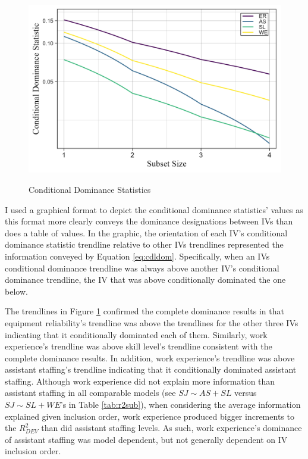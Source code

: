 \documentclass[man]{apa7}
\begin{document}
	\begin{figure}[h!]
		\centering
		\caption{\centering Conditional Dominance Statistics}
		\includegraphics{condit_gph}
		\label{fg:cdl}
	\end{figure}

	I used a graphical format to depict the conditional dominance statistics' values as this format more clearly conveys the dominance designations between IVs than does a table of values. 
	In the graphic, the orientation of each IV's conditional dominance statistic trendline relative to other IVs trendlines represented the information conveyed by Equation \ref{eq:cdldom}.
	Specifically, when an IVs conditional dominance trendline was always above another IV's conditional dominance trendline, the IV that was above conditionally dominated the one below.
	
	The trendlines in Figure \ref{fg:cdl} confirmed the complete dominance results in that equipment reliability's trendline was above the trendlines for the other three IVs indicating that it conditionally dominated each of them.
	Similarly, work experience's trendline was above skill level's trendline consistent with the complete dominance results.
	In addition, work experience's trendline was above assistant staffing's trendline indicating that it conditionally dominated assistant staffing.
	Although work experience did not explain more information than assistant staffing in all comparable models (see $SJ \sim AS + SL$ versus $SJ \sim SL + WE$'s in Table \ref{tab:r2sub}), when considering the average information explained given inclusion order, work experience produced bigger increments to the $R^2_{DEV}$ than did assistant staffing levels. 
	As such, work experience's dominance of assistant staffing was model dependent, but not generally dependent on IV inclusion order.
	
\end{document}
